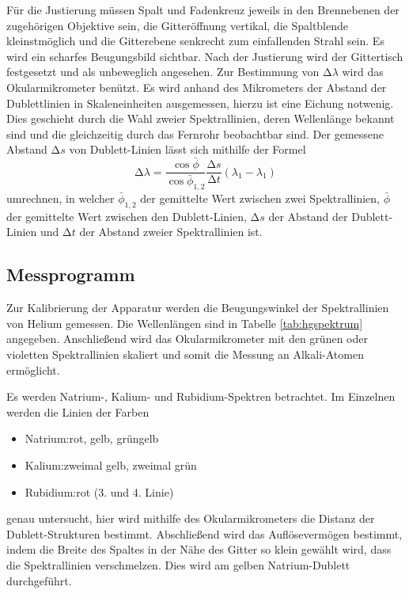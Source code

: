 Für die Justierung müssen Spalt und Fadenkreuz jeweils in den Brennebenen der zugehörigen Objektive sein, die Gitteröffnung vertikal, die Spaltblende kleinstmöglich und die Gitterebene senkrecht zum einfallenden Strahl sein. 
Es wird ein scharfes Beugungsbild sichtbar.
Nach der Justierung wird der Gittertisch festgesetzt und als unbeweglich angesehen.
Zur Bestimmung von $\mathup{\Delta}\lambda$ wird das Okularmikrometer benützt.
Es wird anhand des Mikrometers der Abstand der Dublettlinien in Skaleneinheiten ausgemessen, hierzu ist eine Eichung notwenig.
Dies geschieht durch die Wahl zweier Spektrallinien, deren Wellenlänge bekannt sind und die gleichzeitig durch das Fernrohr beobachtbar sind.
Der gemessene Abstand $\mathup{\Delta}s$ von Dublett-Linien lässt sich mithilfe der Formel
\begin{equation}
	\mathup{\Delta}\lambda=\frac{\cos{\bar\phi}}{\cos{\bar\phi_{1,2}}}\frac{\mathup{\Delta}s}{\mathup{\Delta}t}(\lambda_1-\lambda_1)
\end{equation}
umrechnen, in welcher $\bar\phi_{1,2}$ der gemittelte Wert zwischen zwei Spektrallinien, $\bar\phi$ der gemittelte Wert zwischen den Dublett-Linien, $\mathup{\Delta}s$ der Abstand der Dublett-Linien und $\mathup{\Delta}t$ der Abstand zweier Spektrallinien ist.

\subsection{Messprogramm}
Zur Kalibrierung der Apparatur werden die Beugungswinkel der Spektrallinien von Helium gemessen.
Die Wellenlängen sind in Tabelle \ref{tab:hgspektrum} angegeben.
Anschließend wird das Okularmikrometer mit den grünen oder violetten Spektrallinien skaliert und somit die Messung an Alkali-Atomen ermöglicht.

Es werden Natrium-, Kalium- und Rubidium-Spektren betrachtet.
Im Einzelnen werden die Linien der Farben
\begin{itemize}
	\item{Natrium:\hspace{10pt}rot, gelb, grüngelb}
	\item{Kalium:\hspace{15pt}zweimal gelb, zweimal grün}
	\item{Rubidium:\hspace{3pt}rot (3. und 4. Linie)}
\end{itemize}
genau untersucht, hier wird mithilfe des Okularmikrometers die Distanz der Dublett-Strukturen bestimmt.
Abschließend wird das Auflösevermögen bestimmt, indem die Breite des Spaltes in der Nähe des Gitter so klein gewählt wird, dass die Spektrallinien verschmelzen.
Dies wird am gelben Natrium-Dublett durchgeführt.